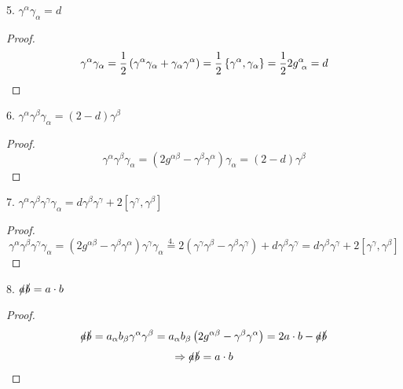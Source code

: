 5. $\gamma^{\alpha}\gamma_{\alpha} = d$
\begin{proof}
\begin{equation*}
\gamma^{\alpha}\gamma_{\alpha} = \frac{1}{2} \left( \gamma^{\alpha}\gamma_{\alpha} + \gamma_{\alpha}\gamma^{\alpha} \right) = \frac{1}{2} \left\lbrace \gamma^{\alpha}, \gamma_{\alpha} \right\rbrace = \frac{1}{2} 2 g^{\alpha}_{ \ \alpha} = d
\end{equation*}
\end{proof}

6. $\gamma^{\alpha}\gamma^{\beta}\gamma_{\alpha} = \left( 2-d \right) \gamma^{\beta}$
\begin{proof}
\begin{equation*}
\gamma^{\alpha}\gamma^{\beta}\gamma_{\alpha} = \left( 2g^{\alpha\beta} - \gamma^{\beta}\gamma^{\alpha} \right) \gamma_{\alpha} = \left( 2-d \right) \gamma^{\beta}
\end{equation*}
\end{proof}

7. $\gamma^{\alpha}\gamma^{\beta}\gamma^{\gamma}\gamma_{\alpha} = d\gamma^{\beta}\gamma^{\gamma} + 2 \left[ \gamma^{\gamma}, \gamma^{\beta} \right]$
\begin{proof}
\begin{equation*}
\gamma^{\alpha}\gamma^{\beta}\gamma^{\gamma}\gamma_{\alpha} = \left( 2g^{\alpha\beta} - \gamma^{\beta}\gamma^{\alpha} \right) \gamma^{\gamma}\gamma_{\alpha} \overset{4.}{=} 2 \left( \gamma^{\gamma}\gamma^{\beta} - \gamma^{\beta}\gamma^{\gamma} \right) + d\gamma^{\beta}\gamma^{\gamma} = d\gamma^{\beta}\gamma^{\gamma} + 2 \left[ \gamma^{\gamma}, \gamma^{\beta} \right]		
\end{equation*}
\end{proof}

8. $\slashed{a}\slashed{b} = a \cdot b$
\begin{proof}
\begin{equation*}
\slashed{a} \slashed{b} = a_{\alpha} b_{\beta} \gamma^{\alpha}\gamma^{\beta} = a_{\alpha} b_{\beta} \left( 2 g^{\alpha\beta} - \gamma^{\beta}\gamma^{\alpha} \right) = 2 a \cdot b - \slashed{a}\slashed{b}
\end{equation*}
\begin{equation*}
\Rightarrow \slashed{a}\slashed{b} = a \cdot b
\end{equation*}
\end{proof}


